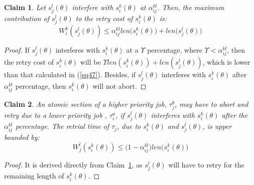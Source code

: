 \documentclass[conference]{IEEEtran}
\newtheorem{clm}{Claim}
\begin{document}
\begin{clm}
\label{LCM_higher_rc}
Let $s_{j}^{l}(\theta)$ interfere with $s_{i}^{k}(\theta)$ at $\alpha_{ij}^{kl}$. Then, the maximum contribution of $s_{j}^{l}(\theta)$ to the retry cost of $s_{i}^{k}(\theta)$ is:
\begin{equation}
W_i^k(s_j^l(\theta))\le \alpha_{ij}^{kl}len\Big(s_{i}^{k}(\theta)\Big)+len\Big(s_{j}^{l}(\theta)\Big)\label{eq47}\end{equation}
\end{clm}
\begin{proof}
If $s_{j}^{l}(\theta)$ interferes with $s_{i}^{k}(\theta)$
at a $\Upsilon$ percentage, where $\Upsilon<\alpha_{ij}^{kl}$,
then the retry cost of $s_{i}^{k}(\theta)$ will be $\Upsilon len(s_{i}^{k}(\theta))+len(s_{j}^{l}(\theta))$, which is lower than that calculated in (\ref{eq47}). Besides, 
if $s_{j}^{l}(\theta)$ interferes with $s_{i}^{k}(\theta)$ after
$\alpha_{ij}^{kl}$ percentage, then $s_{i}^{k}(\theta)$ will not
abort.
\end{proof}

\begin{clm}
\label{LCM_lower_rc}
An atomic section of a higher priority job, $\tau_{j}^b$, may have to abort and retry due to a lower priority job	, $\tau_{i}^a$, if $s_{j}^{l}(\theta)$ interferes
with $s_{i}^{k}(\theta)$ after the $\alpha_{ij}^{kl}$ percentage.
The retrial time of $\tau_{j}$, due to $s_{i}^{k}(\theta)$ and $s_{j}^{l}(\theta)$,
is upper bounded by:
 \begin{equation}
W_j^l(s_i^k(\theta))\le \Big(1-\alpha_{ij}^{kl}\Big)len\Big(s_{i}^{k}(\theta)\Big)\label{eq48}\end{equation}
\end{clm}
\begin{proof}
It is derived directly from Claim~\ref{LCM_higher_rc}, as $s_j^l(\theta)$ will have to retry for the remaining length of $s_i^k(\theta)$.
\end{proof}
\end{document}
